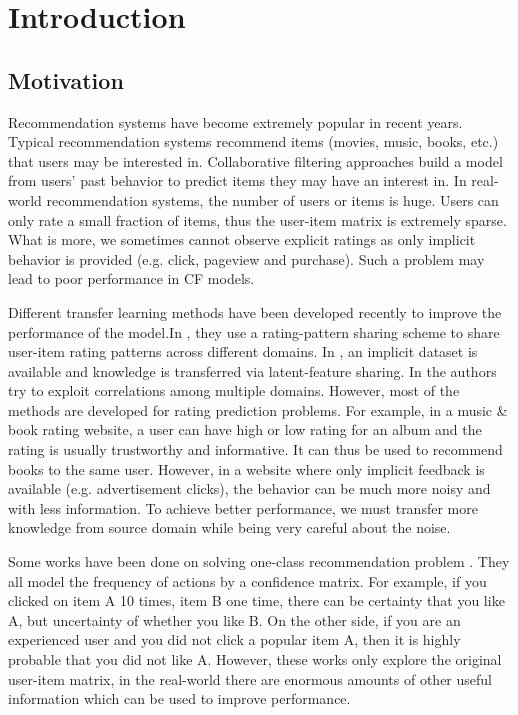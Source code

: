 \chapter{Introduction}
\label{chp:intro}

\hspace{0.1in}
\section{Motivation}
Recommendation systems have become extremely popular in recent years. Typical recommendation systems recommend items (movies, music, books, etc.) that users may be interested in. Collaborative filtering approaches build a model from users’ past behavior to predict items they may have an interest in. In real-world recommendation systems, the number of users or items is huge. Users can only rate a small fraction of items, thus the user-item matrix is extremely sparse. What is more, we sometimes cannot observe explicit ratings as only implicit behavior is provided (e.g. click, pageview and purchase). Such a problem may lead to poor performance in CF models.

Different transfer learning methods have been developed recently to improve the performance of the model.In \cite{/ijcai/libin09, /icml/libin09}, they use a rating-pattern sharing scheme to share user-item rating patterns across different domains. In \cite{/aaai/WPan12, Pan:2011:TLP:2283696.2283784}, an implicit dataset is available and knowledge is transferred via latent-feature sharing. In \cite{/uai/ZhangCY10, DBLP:conf/aaai/EldardiryN11} the authors try to exploit correlations among multiple domains.
However, most of the methods are developed for rating prediction problems. For example, in a music \& book rating website, a user can have high or low rating for an album and the rating is usually trustworthy and informative. It can thus be used to recommend books to the same user. However, in a website where only implicit feedback is available (e.g. advertisement clicks), the behavior can be much more noisy and with less information. To achieve better performance, we must transfer more knowledge from source domain while being very careful about the noise. 

Some works have been done on solving one-class recommendation problem \cite{4781121, 4781145, DBLP:dblp_conf/aaai/LinKH14}. They all model the frequency of actions by a confidence matrix. For example, if you clicked on item A 10 times, item B one time, there can be certainty that you like A, but uncertainty of whether you like B. On the other side, if you are an experienced user and you did not click a popular item A, then it is highly probable that you did not like A. However, these works only explore the original user-item matrix, in the real-world there are enormous amounts of other useful information which can be used to improve performance.

